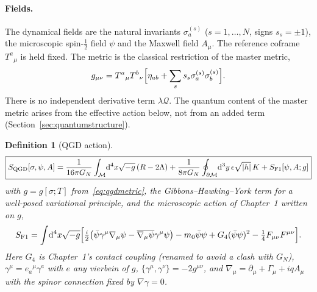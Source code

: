 \documentclass[11pt,a4paper]{article}
\newtheorem{definition}[theorem]{Definition}
\begin{document}
\paragraph{Fields.} The dynamical fields are the natural invariants $\sigma^{(s)}_a$
($s=1,\dots,N$, signs $s_s=\pm1$), the microscopic spin-$\frac12$ field $\psi$ and the Maxwell
field $A_\mu$. The reference coframe $T^a{}_\mu$ is held fixed. The metric is the classical
restriction of the master metric,
\begin{equation}\label{eq:qgdmetric}
g_{\mu\nu}=T^a{}_\mu T^b{}_\nu\Bigl[\eta_{ab}+\sum_ss_s\sigma^{(s)}_a\sigma^{(s)}_b\Bigr].
\end{equation}
There is no independent derivative term $\lambda\mathcal Q$. The quantum content of the
master metric arises from the effective action below, not from an added term
(Section~\ref{sec:quantumstructure}).

\begin{definition}[QGD action]\label{def:qgdaction}
\begin{equation}\label{eq:qgdS}
\boxed{S_{\rm QGD}[\sigma,\psi,A]=\frac1{16\pi G_N}\int_{\mathcal M}\!\mathrm d^4x\sqrt{-g}\,(R-2\Lambda)
+\frac1{8\pi G_N}\oint_{\partial\mathcal M}\!\mathrm d^3y\,\epsilon\sqrt{|h|}\,K
+S_{\rm F1}[\psi,A;g]}
\end{equation}
with $g=g[\sigma;T]$ from~\eqref{eq:qgdmetric}, the Gibbons--Hawking--York term for a
well-posed variational principle, and the microscopic action of Chapter~1 written on $g$,
\begin{equation}\label{eq:SF1}
S_{\rm F1}=\int\!\mathrm d^4x\sqrt{-g}\Bigl[\tfrac i2\bigl(\bar\psi\gamma^\mu\nabla_\mu\psi-\overline{\nabla_\mu\psi}\gamma^\mu\psi\bigr)
-m_0\bar\psi\psi+G_4(\bar\psi\psi)^2-\tfrac14F_{\mu\nu}F^{\mu\nu}\Bigr].
\end{equation}
Here $G_4$ is Chapter~1's contact coupling (renamed to avoid a clash with $G_N$),
$\gamma^\mu=e_a{}^\mu\gamma^a$ with $e$ any vierbein of $g$,
$\{\gamma^\mu,\gamma^\nu\}=-2g^{\mu\nu}$, and
$\nabla_\mu=\partial_\mu+\Gamma_\mu+iqA_\mu$ with the spinor connection fixed by $\nabla\gamma=0$.
\end{definition}
\end{document}
